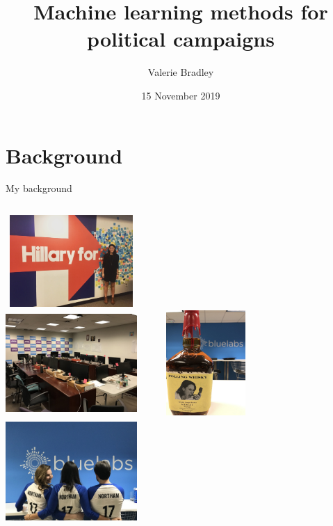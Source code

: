 \documentclass[ignorenonframetext,]{beamer}
\institute[University of Oxford]{University of Oxford, Department of Statistics}
\title{Machine learning methods for political campaigns}
\author{Valerie Bradley}
\date{15 November 2019}
\begin{document}
\begin{frame}
\titlepage
\end{frame}

\begin{frame}
  \tableofcontents[hideallsubsections]
\end{frame}

\section{Background}

\begin{frame}{My background}
\begin{columns}[t]
	\centering
	\includegraphics[width=5cm,height=3.5cm]{photos/hfa_1.jpg}\\
	\includegraphics[width=5cm,height=4cm]{photos/hfa_enight_1.jpg}
	\centering
	\includegraphics[width=5cm,height=4cm]{photos/bl_pollingwhiskey.jpg}\\
	\includegraphics[width=5cm,height=4cm]{photos/bl_va.jpg}
\end{columns}
\end{frame}
\end{document}
